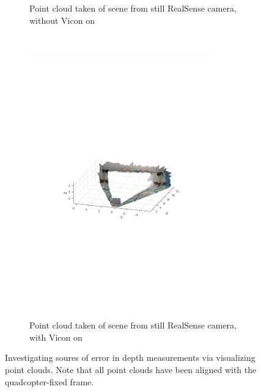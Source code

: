\documentclass[12pt,a4paper]{article}
\begin{document}
\begin{figure}[b!]
\begin{subfigure}[t]{0.5\textwidth}
      \caption{Point cloud taken of scene from still RealSense camera, without Vicon on}
    \end{subfigure} %
    ~
    \begin{subfigure}[t]{0.5\textwidth}
    \centering
      \includegraphics[width=80mm, trim = 100 300 100 290, clip]{vicon_test/with.pdf}
      \caption{Point cloud taken of scene from still RealSense camera, with Vicon on}
    \end{subfigure} 
    \caption{Investigating soures of error in depth measurements via visualizing point clouds. Note that all point clouds have been aligned with the quadcopter-fixed frame.}
    \label{f: pcs}
  \end{figure}
\end{document}
